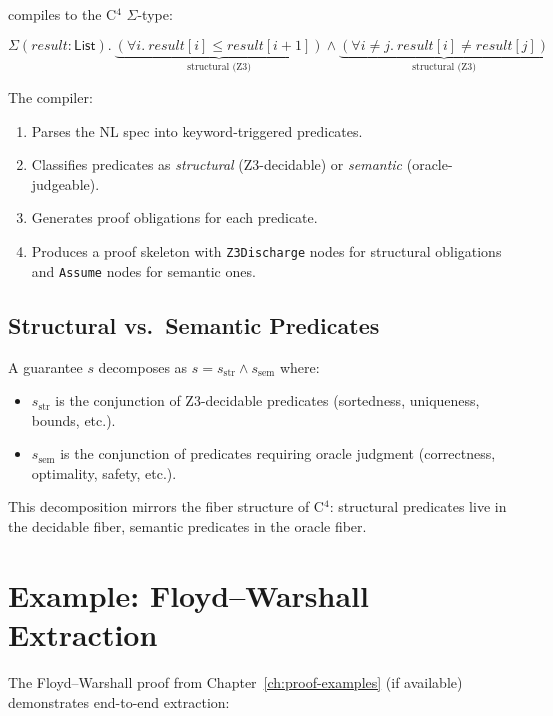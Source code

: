 compiles to the C$^4$ $\Sigma$-type:

\[
  \Sigma(\mathit{result} : \mathsf{List}).\ 
    \underbrace{(\forall i.\ \mathit{result}[i] \le \mathit{result}[i{+}1])}_{\text{structural (Z3)}}
    \wedge
    \underbrace{(\forall i \ne j.\ \mathit{result}[i] \ne \mathit{result}[j])}_{\text{structural (Z3)}}
\]

The compiler:
\begin{enumerate}
  \item Parses the NL spec into keyword-triggered predicates.
  \item Classifies predicates as \emph{structural} (Z3-decidable) or
        \emph{semantic} (oracle-judgeable).
  \item Generates proof obligations for each predicate.
  \item Produces a proof skeleton with \texttt{Z3Discharge} nodes for
        structural obligations and \texttt{Assume} nodes for semantic ones.
\end{enumerate}

\subsection{Structural vs.\ Semantic Predicates}

\begin{definition}
A guarantee $s$ decomposes as $s = s_{\mathrm{str}} \wedge s_{\mathrm{sem}}$ where:
\begin{itemize}
  \item $s_{\mathrm{str}}$ is the conjunction of Z3-decidable predicates
    (sortedness, uniqueness, bounds, etc.).
  \item $s_{\mathrm{sem}}$ is the conjunction of predicates requiring
    oracle judgment (correctness, optimality, safety, etc.).
\end{itemize}
\end{definition}

This decomposition mirrors the fiber structure of C$^4$: structural predicates
live in the decidable fiber, semantic predicates in the oracle fiber.


\section{Example: Floyd--Warshall Extraction}

The Floyd--Warshall proof from Chapter~\ref{ch:proof-examples} (if available)
demonstrates end-to-end extraction:

